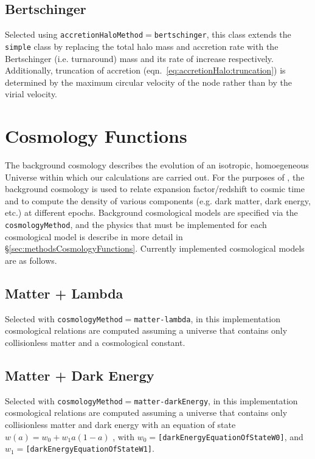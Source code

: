 \subsection{Bertschinger}\label{phys:accretionHalo:accretionHaloBertschinger}

Selected using {\tt accretionHaloMethod}$=${\tt bertschinger}, this class extends the {\tt simple} class by replacing the total halo mass and accretion rate with the Bertschinger (i.e. turnaround) mass and its rate of increase respectively. Additionally, truncation of accretion (eqn.~\ref{eq:accretionHalo:truncation}) is determined by the maximum circular velocity of the node rather than by the virial velocity.

\section{Cosmology Functions}

The background cosmology describes the evolution of an isotropic, homoegeneous Universe within which our calculations are carried out. For the purposes of \glc, the background cosmology is used to relate expansion factor/redshift to cosmic time and to compute the density of various components (e.g. dark matter, dark energy, etc.) at different epochs. Background cosmological models are specified via the {\tt cosmologyMethod}, and the physics that must be implemented for each cosmological model is describe in more detail in \S\ref{sec:methodsCosmologyFunctions}. Currently implemented cosmological models are as follows.

\subsection{Matter + Lambda}\label{phys:cosmologyFunctions:cosmologyFunctionsMatterLambda}

Selected with {\tt cosmologyMethod}$=${\tt matter-lambda}, in this implementation cosmological relations are computed assuming a universe that contains only collisionless matter and a cosmological constant.

\subsection{Matter + Dark Energy}\label{phys:cosmologyFunctions:cosmologyFunctionsMatterDarkEnergy}

Selected with {\tt cosmologyMethod}$=${\tt matter-darkEnergy}, in this implementation cosmological relations are computed assuming a universe that contains only collisionless matter and dark energy with an equation of state $w(a)=w_0+w_1a(1-a)$ \citep{jassal_wmap_2005}, with $w_0=${\tt [darkEnergyEquationOfStateW0]}, and $w_1=${\tt [darkEnergyEquationOfStateW1]}.

